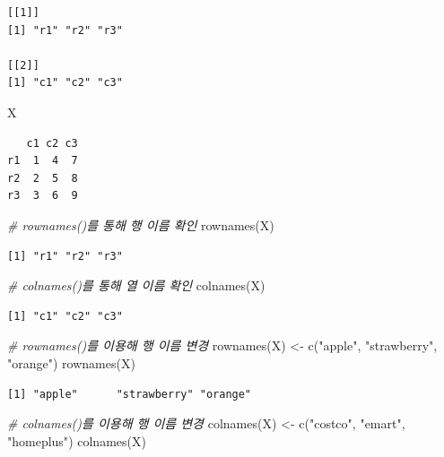 \documentclass[
  11pt,
]{krantz}
\newenvironment{Shaded}{\begin{snugshade}}{\end{snugshade}}
\newcommand{\CommentTok}[1]{\textcolor[rgb]{0.37,0.37,0.37}{\textit{#1}}}
\newcommand{\FunctionTok}[1]{\textcolor[rgb]{0,0,0}{#1}}
\newcommand{\NormalTok}[1]{#1}
\newcommand{\OtherTok}[1]{\textcolor[rgb]{0.37,0.37,0.37}{#1}}
\newcommand{\StringTok}[1]{\textcolor[rgb]{0.5,0.5,0.5}{#1}}
\begin{document}
\begin{verbatim}
[[1]]
[1] "r1" "r2" "r3"

[[2]]
[1] "c1" "c2" "c3"
\end{verbatim}

\begin{Shaded}
\begin{Highlighting}[]
\NormalTok{X}
\end{Highlighting}
\end{Shaded}

\begin{verbatim}
   c1 c2 c3
r1  1  4  7
r2  2  5  8
r3  3  6  9
\end{verbatim}

\begin{Shaded}
\begin{Highlighting}[]
\CommentTok{\# rownames()를 통해 행 이름 확인}
\FunctionTok{rownames}\NormalTok{(X)}
\end{Highlighting}
\end{Shaded}

\begin{verbatim}
[1] "r1" "r2" "r3"
\end{verbatim}

\begin{Shaded}
\begin{Highlighting}[]
\CommentTok{\# colnames()를 통해 열 이름 확인}
\FunctionTok{colnames}\NormalTok{(X)}
\end{Highlighting}
\end{Shaded}

\begin{verbatim}
[1] "c1" "c2" "c3"
\end{verbatim}

\begin{Shaded}
\begin{Highlighting}[]
\CommentTok{\# rownames()를 이용해 행 이름 변경}
\FunctionTok{rownames}\NormalTok{(X) }\OtherTok{\textless{}{-}} \FunctionTok{c}\NormalTok{(}\StringTok{"apple"}\NormalTok{, }\StringTok{"strawberry"}\NormalTok{, }\StringTok{"orange"}\NormalTok{)}
\FunctionTok{rownames}\NormalTok{(X)}
\end{Highlighting}
\end{Shaded}

\begin{verbatim}
[1] "apple"      "strawberry" "orange"    
\end{verbatim}

\begin{Shaded}
\begin{Highlighting}[]
\CommentTok{\# colnames()를 이용해 행 이름 변경}
\FunctionTok{colnames}\NormalTok{(X) }\OtherTok{\textless{}{-}} \FunctionTok{c}\NormalTok{(}\StringTok{"costco"}\NormalTok{, }\StringTok{"emart"}\NormalTok{, }\StringTok{"homeplus"}\NormalTok{)}
\FunctionTok{colnames}\NormalTok{(X)}
\end{Highlighting}
\end{Shaded}
\end{document}
